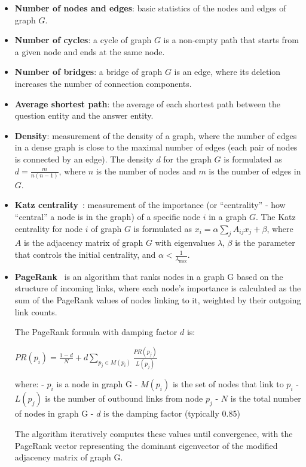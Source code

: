 \begin{itemize}
    \item \textbf{Number of nodes and edges}: basic statistics of the nodes and edges of graph $G$.
    \item \textbf{Number of cycles}: a cycle of graph $G$ is a non-empty path that starts from a given node and ends at the same node. 
    \item \textbf{Number of bridges}: a bridge of graph $G$ is an edge, where its deletion increases the number of connection components. 
    \item \textbf{Average shortest path}: the average of each shortest path between the question entity and the answer entity. 
    \item \textbf{Density}: measurement of the density of a graph, where the number of edges in a dense graph is close to the maximal number of edges (each pair of nodes is connected by an edge). The density $d$ for the graph $G$ is formulated as $d = \frac{m}{n(n-1)}$, where $n$ is the number of nodes and $m$ is the number of edges in $G$.
   \item \textbf{Katz centrality}~\cite{katz1953new}: measurement of the importance (or ``centrality'' - how ``central'' a node is in the graph) of a specific node $i$ in a graph $G$. The Katz centrality for node $i$ of graph $G$ is formulated as $x_i = \alpha \sum_{j} A_{ij} x_j + \beta$, where $A$ is the adjacency matrix of graph $G$ with eigenvalues $\lambda$, $\beta$ is the parameter that controls the initial centrality, and $\alpha < \frac{1}{\lambda_{\max}}$. 
    \item \textbf{PageRank}~\cite{page1999pagerank} is an algorithm that ranks nodes in a graph G based on the structure of incoming links, where each node's importance is calculated as the sum of the PageRank values of nodes linking to it, weighted by their outgoing link counts.

    The PageRank formula with damping factor $d$ is:
    
    $ PR(p_i) = \frac{1-d}{N} + d\sum_{p_j \in M(p_i)} \frac{PR(p_j)}{L(p_j)} $
    
    where:
    - $p_i$ is a node in graph G
    - $M(p_i)$ is the set of nodes that link to $p_i$
    - $L(p_j)$ is the number of outbound links from node $p_j$
    - $N$ is the total number of nodes in graph G
    - $d$ is the damping factor (typically 0.85)
    
    The algorithm iteratively computes these values until convergence, with the PageRank vector representing the dominant eigenvector of the modified adjacency matrix of graph G.
\end{itemize}

